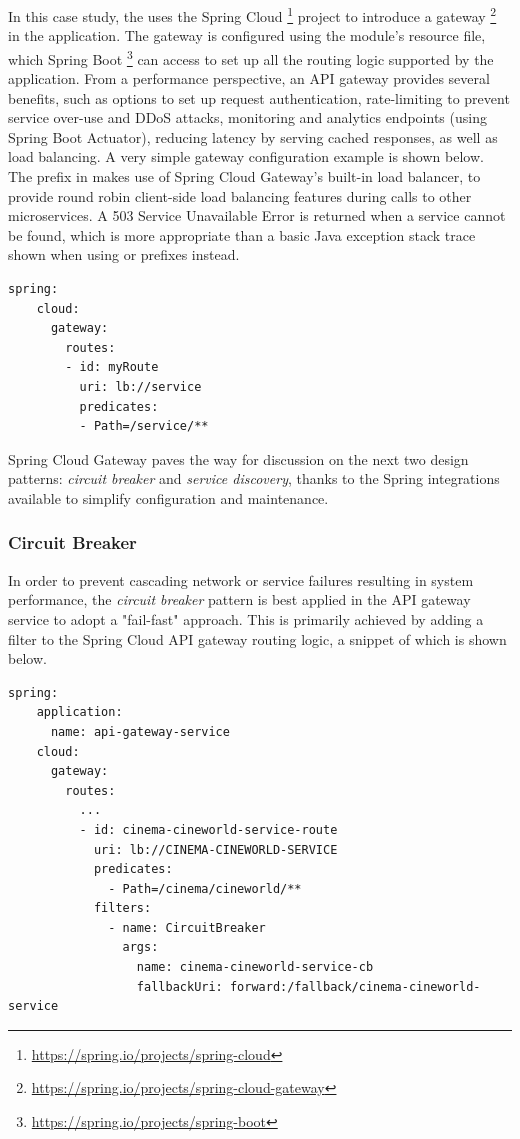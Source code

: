 In this case study, the  uses the Spring Cloud \footnote{\url{https://spring.io/projects/spring-cloud}} project to introduce a gateway \footnote{\url{https://spring.io/projects/spring-cloud-gateway}} in the application. The gateway is configured using the module's  resource file, which Spring Boot \footnote{\url{https://spring.io/projects/spring-boot}} can access to set up all the routing logic supported by the application. From a performance perspective, an API gateway provides several benefits, such as options to set up request authentication, rate-limiting to prevent service over-use and DDoS attacks, monitoring and analytics endpoints (using Spring Boot Actuator), reducing latency by serving cached responses, as well as load balancing. A very simple gateway configuration example is shown below. The  prefix in  makes use of Spring Cloud Gateway's built-in load balancer, to provide round robin client-side load balancing features during calls to other microservices. A 503 Service Unavailable Error is returned when a service cannot be found, which is more appropriate than a basic Java exception stack trace shown when using  or  prefixes instead.

\begin{lstlisting}[caption=Sample Spring Cloud Gateway configuration]
  spring:
    cloud:
      gateway:
        routes:
        - id: myRoute
          uri: lb://service
          predicates:
          - Path=/service/**
\end{lstlisting}

Spring Cloud Gateway paves the way for discussion on the next two design patterns: \textit{circuit breaker} and \textit{service discovery}, thanks to the Spring integrations available to simplify configuration and maintenance.

\subsubsection{Circuit Breaker}

In order to prevent cascading network or service failures resulting in system performance, the \textit{circuit breaker} pattern is best applied in the API gateway service to adopt a "fail-fast" approach. This is primarily achieved by adding a  filter to the Spring Cloud API gateway routing logic, a snippet of which is shown below.

\begin{lstlisting}[caption=Snippet from the API gateway service's application properties]
  spring:
    application:
      name: api-gateway-service
    cloud:
      gateway:
        routes:
          ...
          - id: cinema-cineworld-service-route
            uri: lb://CINEMA-CINEWORLD-SERVICE
            predicates:
              - Path=/cinema/cineworld/**
            filters:
              - name: CircuitBreaker
                args:
                  name: cinema-cineworld-service-cb
                  fallbackUri: forward:/fallback/cinema-cineworld-service
\end{lstlisting}

